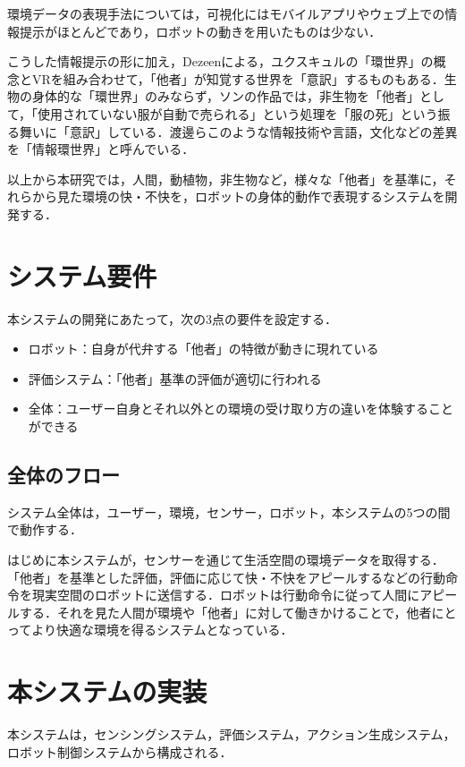 \documentclass[paper=a4paper,jafontsize=9pt,head_space=15mm,gutter=20mm,
twocolumn,number_of_lines=49, line_length=26zw]{myuarticle}
\begin{document}
環境データの表現手法については，可視化にはモバイルアプリやウェブ上での情報提示がほとんどであり\cite{Saini-2020-IndoorAirQualityMonitoring}，ロボットの動きを用いたものは少ない．

こうした情報提示の形に加え，Dezeen\cite{-2015-VirtualRealityPresentsForest}による，ユクスキュルの「環世界」の概念とVRを組み合わせて，「他者」が知覚する世界を「意訳」\cite{渡邉-2019-情報環世}するものもある．生物の身体的な「環世界」のみならず，ソン\cite{--ソンヨン}の作品では，非生物を「他者」として，「使用されていない服が自動で売られる」という処理を「服の死」という振る舞いに「意訳」している．渡邊ら\cite{渡邉-2019-情報環世}このような情報技術や言語，文化などの差異を「情報環世界」と呼んでいる．

以上から本研究では，人間，動植物，非生物など，様々な「他者」を基準に，それらから見た環境の快・不快を，ロボットの身体的動作で表現するシステムを開発する．

\section{システム要件}
本システムの開発にあたって，次の3点の要件を設定する．

\begin{itemize}
  \item ロボット：自身が代弁する「他者」の特徴が動きに現れている
  \item 評価システム：「他者」基準の評価が適切に行われる
  \item 全体：ユーザー自身とそれ以外との環境の受け取り方の違いを体験することができる
\end{itemize}

\subsection{全体のフロー}
システム全体は，ユーザー，環境，センサー，ロボット，本システムの5つの間で動作する．

はじめに本システムが，センサーを通じて生活空間の環境データを取得する．「他者」を基準とした評価，評価に応じて快・不快をアピールするなどの行動命令を現実空間のロボットに送信する．ロボットは行動命令に従って人間にアピールする．それを見た人間が環境や「他者」に対して働きかけることで，他者にとってより快適な環境を得るシステムとなっている．

\section{本システムの実装}
本システムは，センシングシステム，評価システム，アクション生成システム，ロボット制御システムから構成される．
\end{document}
